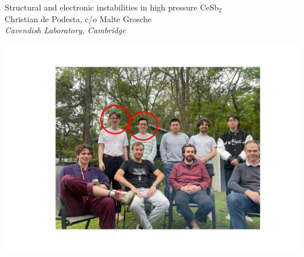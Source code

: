 \begin{frame}[label=TitlePage]
\begin{center}
\textcolor[rgb]{0.2,0.2,0.7}{Structural and electronic instabilities in high pressure CeSb$_2$} \\
\vspace{0.5em}
{\footnotesize Christian de Podesta, c/o Malte Grosche} \\
{\footnotesize \em Cavendish Laboratory, Cambridge} \\
\vspace{0.1em}
\end{center}
\vspace{0.0em}
\centerline{ \includegraphics[width=0.75\columnwidth]{GroupPhoto}}


\end{frame}
